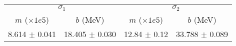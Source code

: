 \begin{tabular}{cc|cc}
\multicolumn{2}{c|}{$\sigma_1$} & \multicolumn{2}{|c}{$\sigma_2$} \\
$m$ ($\times1e5$) & $b$ (MeV) & $m$ ($\times1e5$) & $b$ (MeV) \\
\hline
8.614 $\pm$ 0.041 & 18.405 $\pm$ 0.030 & 12.84 $\pm$ 0.12 & 33.788 $\pm$ 0.089\\
\end{tabular}
